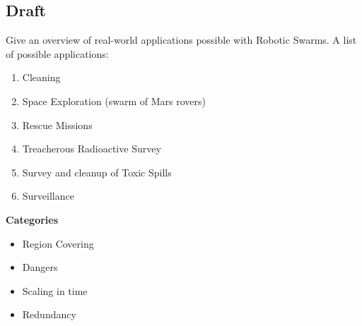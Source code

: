   \subsection{Draft}
  Give an overview of real-world applications possible with Robotic Swarms. A list of possible applications:
    \begin{enumerate}
      \item Cleaning
      \item Space Exploration (swarm of Mars rovers)
      \item Rescue Missions
      \item Treacherous Radioactive Survey
      \item Survey and cleanup of Toxic Spills
      \item Surveillance
    \end{enumerate}
  \textbf{Categories}
    \begin{itemize}
      \item Region Covering
      \item Dangers
      \item Scaling in time
      \item Redundancy
    \end{itemize}
  